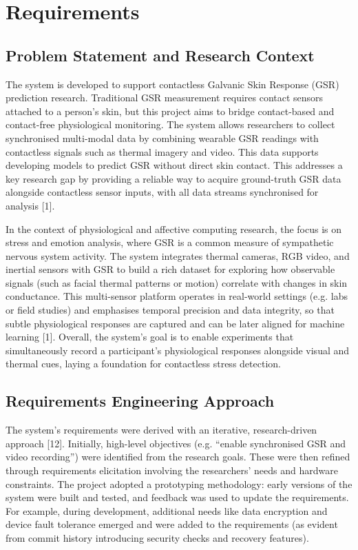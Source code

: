 \chapter{Requirements}

\section{Problem Statement and Research Context}
The system is developed to support contactless Galvanic Skin Response (GSR) prediction research. Traditional GSR measurement requires contact sensors attached to a person's skin, but this project aims to bridge contact-based and contact-free physiological monitoring. The system allows researchers to collect synchronised multi-modal data by combining wearable GSR readings with contactless signals such as thermal imagery and video. This data supports developing models to predict GSR without direct skin contact. This addresses a key research gap by providing a reliable way to acquire ground-truth GSR data alongside contactless sensor inputs, with all data streams synchronised for analysis [1].

In the context of physiological and affective computing research, the focus is on stress and emotion analysis, where GSR is a common measure of sympathetic nervous system activity. The system integrates thermal cameras, RGB video, and inertial sensors with GSR to build a rich dataset for exploring how observable signals (such as facial thermal patterns or motion) correlate with changes in skin conductance. This multi-sensor platform operates in real-world settings (e.g. labs or field studies) and emphasises temporal precision and data integrity, so that subtle physiological responses are captured and can be later aligned for machine learning [1]. Overall, the system's goal is to enable experiments that simultaneously record a participant's physiological responses alongside visual and thermal cues, laying a foundation for contactless stress detection.

\section{Requirements Engineering Approach}
The system's requirements were derived with an iterative, research-driven approach [12]. Initially, high-level objectives (e.g. ``enable synchronised GSR and video recording'') were identified from the research goals. These were then refined through requirements elicitation involving the researchers' needs and hardware constraints. The project adopted a prototyping methodology: early versions of the system were built and tested, and feedback was used to update the requirements. For example, during development, additional needs like data encryption and device fault tolerance emerged and were added to the requirements (as evident from commit history introducing security checks and recovery features).

